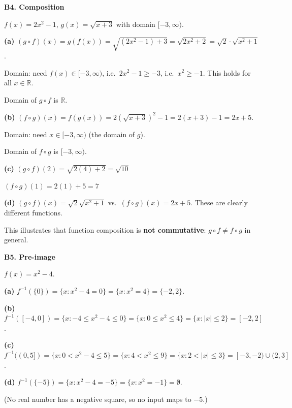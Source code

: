\documentclass[12pt, a4paper]{article}
\theoremstyle{definition}
\newcommand{\R}{\mathbb{R}}
\begin{document}
\begin{solbox}
\textbf{B4. Composition}

$f(x)=2x^2-1$, $g(x)=\sqrt{x+3}$ with domain $[-3,\infty)$.

\textbf{(a)} $(g\circ f)(x)=g(f(x))=\sqrt{(2x^2-1)+3}=\sqrt{2x^2+2}=\sqrt{2}\cdot\sqrt{x^2+1}$.

Domain: need $f(x)\in[-3,\infty)$, i.e.\ $2x^2-1\geq -3$, i.e.\ $x^2\geq -1$. This holds for all $x\in\R$.

Domain of $g\circ f$ is $\R$.

\textbf{(b)} $(f\circ g)(x)=f(g(x))=2(\sqrt{x+3})^2-1=2(x+3)-1=2x+5$.

Domain: need $x\in[-3,\infty)$ (the domain of $g$).

Domain of $f\circ g$ is $[-3,\infty)$.

\textbf{(c)} $(g\circ f)(2)=\sqrt{2(4)+2}=\sqrt{10}$

$(f\circ g)(1)=2(1)+5=7$

\textbf{(d)} $(g\circ f)(x)=\sqrt{2}\sqrt{x^2+1}$ vs.\ $(f\circ g)(x)=2x+5$. These are clearly different functions.

This illustrates that function composition is \textbf{not commutative}: $g\circ f\neq f\circ g$ in general.
\end{solbox}
\newpage
\begin{solbox}
\textbf{B5. Pre-image}

$f(x)=x^2-4$.

\textbf{(a)} $f^{-1}(\{0\})=\{x:x^2-4=0\}=\{x:x^2=4\}=\{-2,2\}$.

\textbf{(b)} $f^{-1}([-4,0])=\{x:-4\leq x^2-4\leq 0\}=\{x:0\leq x^2\leq 4\}=\{x:|x|\leq 2\}=[-2,2]$.

\textbf{(c)} $f^{-1}((0,5])=\{x:0<x^2-4\leq 5\}=\{x:4<x^2\leq 9\}=\{x:2<|x|\leq 3\}=[-3,-2)\cup(2,3]$.

\textbf{(d)} $f^{-1}(\{-5\})=\{x:x^2-4=-5\}=\{x:x^2=-1\}=\emptyset$.

(No real number has a negative square, so no input maps to $-5$.)
\end{solbox}
\end{document}
